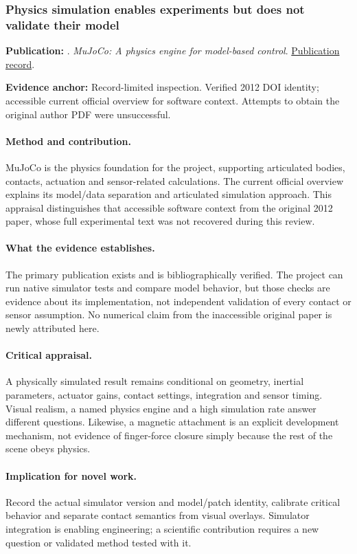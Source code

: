 \subsubsection{Physics simulation enables experiments but does not validate their model}\label{paper:mujoco}
\textbf{Publication:} \citet{mujoco}. \emph{MuJoCo: A physics engine for model-based control}. \href{https://doi.org/10.1109/iros.2012.6386109}{Publication record}.

\textbf{Evidence anchor:} Record-limited inspection. Verified 2012 DOI identity; accessible current official overview for software context. Attempts to obtain the original author PDF were unsuccessful.

\paragraph{Method and contribution.} MuJoCo is the physics foundation for the project, supporting articulated bodies, contacts, actuation and sensor-related calculations. The current official overview explains its model/data separation and articulated simulation approach. This appraisal distinguishes that accessible software context from the original 2012 paper, whose full experimental text was not recovered during this review.

\paragraph{What the evidence establishes.} The primary publication exists and is bibliographically verified. The project can run native simulator tests and compare model behavior, but those checks are evidence about its implementation, not independent validation of every contact or sensor assumption. No numerical claim from the inaccessible original paper is newly attributed here.

\paragraph{Critical appraisal.} A physically simulated result remains conditional on geometry, inertial parameters, actuator gains, contact settings, integration and sensor timing. Visual realism, a named physics engine and a high simulation rate answer different questions. Likewise, a magnetic attachment is an explicit development mechanism, not evidence of finger-force closure simply because the rest of the scene obeys physics.

\paragraph{Implication for novel work.} Record the actual simulator version and model/patch identity, calibrate critical behavior and separate contact semantics from visual overlays. Simulator integration is enabling engineering; a scientific contribution requires a new question or validated method tested with it.

